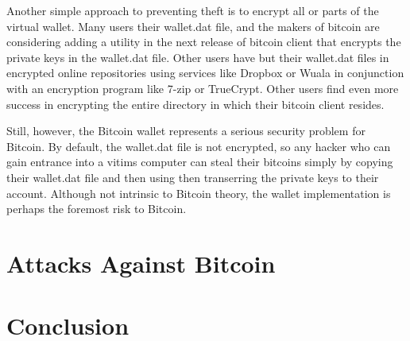 \documentclass{report}
\begin{document}
Another simple approach to preventing theft is to encrypt all or parts of the virtual 
wallet.  Many users their wallet.dat file, and the makers of bitcoin are considering 
adding a utility in the next release of bitcoin client that encrypts the private keys 
in the wallet.dat file.  Other users have but their wallet.dat files in encrypted online 
repositories using services like Dropbox or Wuala in conjunction with an encryption 
program like 7-zip or TrueCrypt.  Other users find even more success in encrypting the 
entire directory in which their bitcoin client resides.

Still, however, the Bitcoin wallet represents a serious security problem for Bitcoin.  
By default, the wallet.dat file is not encrypted, so any hacker who can gain entrance 
into a vitims computer can steal their bitcoins simply by copying their wallet.dat file 
and then using then transerring the private keys to their account.  Although not intrinsic 
to Bitcoin theory, the wallet implementation is perhaps the foremost risk to Bitcoin.

\section*{Attacks Against Bitcoin}

\section*{Conclusion}

{}

\end{document}
